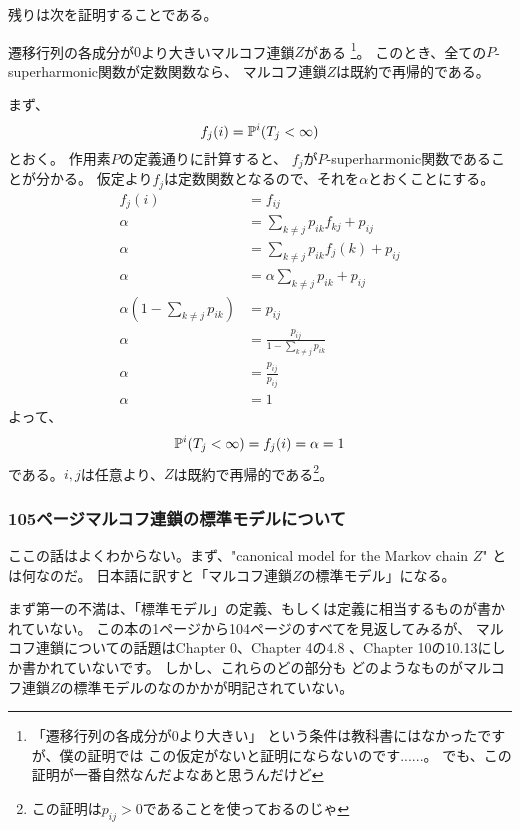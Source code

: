         残りは次を証明することである。
        \begin{center}
          遷移行列の各成分が$0$より大きいマルコフ連鎖$Z$がある
          \footnote{「遷移行列の各成分が$0$より大きい」
          という条件は教科書にはなかったですが、僕の証明では
          この仮定がないと証明にならないのです......。
          でも、この証明が一番自然なんだよなあと思うんだけど}。
          このとき、全ての$P$-superharmonic関数が定数関数なら、
          マルコフ連鎖$Z$は既約で再帰的である。
        \end{center}

        まず、
        \[
          f_j(i) = {\mathbb{P}}^i(T_j < \infty)
        \]
        とおく。
        作用素$P$の定義通りに計算すると、
        $f_j$が$P$-superharmonic関数であることが分かる。
        仮定より$f_j$は定数関数となるので、それを$\alpha$とおくことにする。
        \begin{align*}
          f_j(i) &= f_{ij}\\
          \alpha &= \sum_{k \neq j} p_{ik}f_{kj} + p_{ij}\\
          \alpha &= \sum_{k \neq j} p_{ik}f_j(k) + p_{ij}\\
          \alpha &= \alpha\sum_{k \neq j} p_{ik} + p_{ij}\\
          \alpha \left(1 - \sum_{k \neq j} p_{ik} \right) &= p_{ij}\\
          \alpha &= \frac{p_{ij}}{1 - \sum_{k \neq j} p_{ik}}\\
          \alpha &= \frac{p_{ij}}{p_{ij}}\\
          \alpha &= 1
        \end{align*}
        よって、
        \[
          {\mathbb{P}}^i(T_j < \infty) =f_{j}(i) = \alpha = 1
        \]
        である。$i,j$は任意より、$Z$は既約で再帰的である\footnote{この証明は$p_{ij} > 0$であることを使っておるのじゃ}。

      \subsubsection{105ページマルコフ連鎖の標準モデルについて}
        ここの話はよくわからない。まず、"canonical model for the Markov chain $Z$"
        とは何なのだ。
        日本語に訳すと「マルコフ連鎖$Z$の標準モデル」になる。

        まず第一の不満は、「標準モデル」の定義、もしくは定義に相当するものが書かれていない。
        この本の1ページから104ページのすべてを見返してみるが、
        マルコフ連鎖についての話題はChapter 0、Chapter 4の4.8
        、Chapter 10の10.13にしか書かれていないです。
        しかし、これらのどの部分も
        どのようなものがマルコフ連鎖$Z$の標準モデルのなのかかが明記されていない。

